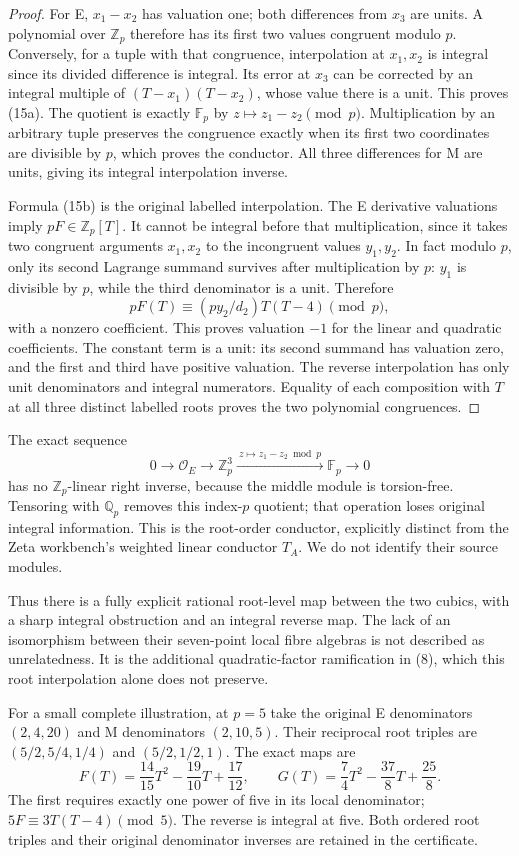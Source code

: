\begin{proof}
For E, $x_1-x_2$ has valuation one; both differences from $x_3$ are units.
A polynomial over $\mathbb Z_p$ therefore has its first two values congruent
modulo $p$. Conversely, for a tuple with that congruence, interpolation at
$x_1,x_2$ is integral since its divided difference is integral. Its error at
$x_3$ can be corrected by an integral multiple of $(T-x_1)(T-x_2)$, whose
value there is a unit. This proves (15a). The quotient is exactly $\mathbb F_p$
by $z\mapsto z_1-z_2\pmod p$. Multiplication by an arbitrary tuple preserves
the congruence exactly when its first two coordinates are divisible by $p$,
which proves the conductor. All three differences for M are units, giving its
integral interpolation inverse.

Formula (15b) is the original labelled interpolation. The E derivative
valuations imply $pF\in\mathbb Z_p[T]$. It cannot be integral before that
multiplication, since it takes two congruent arguments $x_1,x_2$ to the
incongruent values $y_1,y_2$. In fact modulo $p$, only its second Lagrange
summand survives after multiplication by $p$: $y_1$ is divisible by $p$,
while the third denominator is a unit. Therefore
\[
 pF(T)\equiv (p y_2/d_2)T(T-4)\pmod p,
\]
with a nonzero coefficient. This proves valuation $-1$ for the linear and
quadratic coefficients. The constant term is a unit: its second summand has
valuation zero, and the first and third have positive valuation. The reverse
interpolation has only unit denominators and integral numerators.
Equality of each composition with $T$ at all three distinct labelled roots
proves the two polynomial congruences.
\end{proof}

The exact sequence
\[
 0\longrightarrow\mathcal O_E\longrightarrow\mathbb Z_p^3
 \xrightarrow{\ z\mapsto z_1-z_2\bmod p\ }\mathbb F_p
 \longrightarrow0
\]
has no $\mathbb Z_p$-linear right inverse, because the middle module is
torsion-free. Tensoring with $\mathbb Q_p$ removes this index-$p$ quotient;
that operation loses original integral information. This is the root-order
conductor, explicitly distinct from the Zeta workbench's weighted linear
conductor $T_A$. We do not identify their source modules.

Thus there is a fully explicit rational root-level map between the two cubics,
with a sharp integral obstruction and an integral reverse map. The lack of an
isomorphism between their seven-point local fibre algebras is not described as
unrelatedness. It is the additional quadratic-factor ramification in (8),
which this root interpolation alone does not preserve.

For a small complete illustration, at $p=5$ take the original E denominators
$(2,4,20)$ and M denominators $(2,10,5)$. Their reciprocal root triples are
$(5/2,5/4,1/4)$ and $(5/2,1/2,1)$. The exact maps are
\[
 \boxed{F(T)=\frac{14}{15}T^2-\frac{19}{10}T+\frac{17}{12},\qquad
 G(T)=\frac74T^2-\frac{37}{8}T+\frac{25}{8}.}
\]
The first requires exactly one power of five in its local denominator;
$5F\equiv3T(T-4)\pmod5$. The reverse is integral at five. Both ordered root
triples and their original denominator inverses are retained in the certificate.
